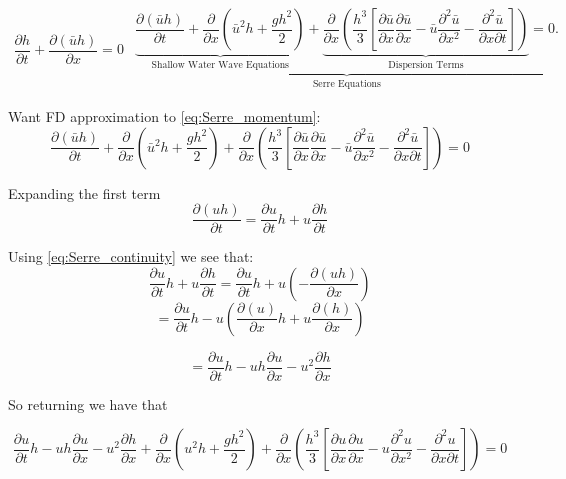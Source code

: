 \documentclass{article}
\begin{document}
\begin{subequations}\label{eq:Serre_conservative_form}
\begin{gather}
\dfrac{\partial h}{\partial t} + \dfrac{\partial (\bar{u}h)}{\partial x} = 0
\label{eq:Serre_continuity}
\end{gather}
\begin{gather}
\underbrace{\underbrace{\dfrac{\partial (\bar{u}h)}{\partial t} + \dfrac{\partial}{\partial x} \left ( \bar{u}^2h + \dfrac{gh^2}{2}\right )}_{\text{Shallow Water Wave Equations}} + \underbrace{\dfrac{\partial}{\partial x} \left (  \dfrac{h^3}{3} \left [ \dfrac{\partial \bar{u} }{\partial x} \dfrac{\partial \bar{u}}{\partial x} - \bar{u} \dfrac{\partial^2 \bar{u}}{\partial x^2}  - \dfrac{\partial^2 \bar{u}}{\partial x \partial t}\right ] \right )}_{\text{Dispersion Terms}} = 0.}_{\text{Serre Equations}}
\label{eq:Serre_momentum}
\end{gather}
\end{subequations}


Want FD approximation to \eqref{eq:Serre_momentum}:
$$\dfrac{\partial (\bar{u}h)}{\partial t} + \dfrac{\partial}{\partial x} \left ( \bar{u}^2h + \dfrac{gh^2}{2}\right ) + \dfrac{\partial}{\partial x} \left (  \dfrac{h^3}{3} \left [ \dfrac{\partial \bar{u} }{\partial x} \dfrac{\partial \bar{u}}{\partial x} - \bar{u} \dfrac{\partial^2 \bar{u}}{\partial x^2}  - \dfrac{\partial^2 \bar{u}}{\partial x \partial t}\right ] \right ) = 0$$

Expanding the first term
\[\dfrac{\partial (uh)}{\partial t} = \dfrac{\partial u}{\partial t}h + u \dfrac{\partial h}{\partial t} \]

Using \eqref{eq:Serre_continuity} we see that:
\[\dfrac{\partial u}{\partial t}h + u \dfrac{\partial h}{\partial t} = \dfrac{\partial u}{\partial t}h + u \left(-\dfrac{\partial (uh)}{\partial x}\right)\]
\[= \dfrac{\partial u}{\partial t}h - u \left(\dfrac{\partial (u)}{\partial x}h +u\dfrac{\partial (h)}{\partial x} \right)\]

\[= \dfrac{\partial u}{\partial t}h - uh \dfrac{\partial u}{\partial x} -u^2\dfrac{\partial h}{\partial x}\]

So returning we have that

$$\dfrac{\partial u}{\partial t}h - uh \dfrac{\partial u}{\partial x} -u^2\dfrac{\partial h}{\partial x} + \dfrac{\partial}{\partial x} \left ( u^2h + \dfrac{gh^2}{2}\right) + \dfrac{\partial}{\partial x} \left (  \dfrac{h^3}{3} \left [ \dfrac{\partial u }{\partial x} \dfrac{\partial u}{\partial x} - u \dfrac{\partial^2 u}{\partial x^2}  - \dfrac{\partial^2 u}{\partial x \partial t}\right ] \right ) = 0$$
\end{document}
